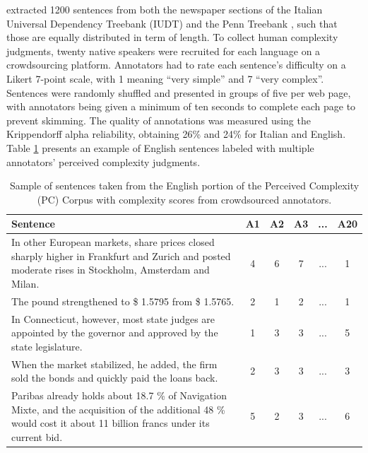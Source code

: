 \documentclass[a4paper, nobind]{templates/ociamthesis}
\begin{document}
\textcite{brunato-etal-2018-sentence} extracted 1200 sentences from both the newspaper sections of the Italian Universal Dependency Treebank (IUDT) \autocite{simi-etal-2014-less} and the Penn Treebank \autocite{mcdonald-etal-2013-universal}, such that those are equally distributed in term of length. To collect human complexity judgments, twenty native speakers were recruited for each language on a crowdsourcing platform. Annotators had to rate each sentence's difficulty on a Likert 7-point scale, with 1 meaning ``very simple'' and 7 ``very complex''. Sentences were randomly shuffled and presented in groups of five per web page, with annotators being given a minimum of ten seconds to complete each page to prevent skimming. The quality of annotations was measured using the Krippendorff alpha reliability, obtaining 26\% and 24\% for Italian and English. Table \ref{tab:pc-example} presents an example of English sentences labeled with multiple annotators' perceived complexity judgments.

\begin{table}

\caption{\label{tab:pc-example}Sample of sentences taken from the English portion of the Perceived Complexity (PC) Corpus with complexity scores from crowdsourced annotators.}
\centering
\begin{tabular}[t]{>{\raggedright\arraybackslash}p{25em}ccccc}
\toprule
\textbf{Sentence} & \textbf{A1} & \textbf{A2} & \textbf{A3} & \textbf{...} & \textbf{A20}\\
\midrule
In other European markets, share prices closed sharply higher in Frankfurt and Zurich and posted moderate rises in Stockholm, Amsterdam and Milan. & 4 & 6 & 7 & ... & 1\\
\addlinespace\hline\addlinespace
The pound strengthened to \$ 1.5795 from \$ 1.5765. & 2 & 1 & 2 & ... & 1\\
\addlinespace\hline\addlinespace
In Connecticut, however, most state judges are appointed by the governor and approved by the state legislature. & 1 & 3 & 3 & ... & 5\\
\addlinespace\hline\addlinespace
When the market stabilized, he added, the firm sold the bonds and quickly paid the loans back. & 2 & 3 & 3 & ... & 3\\
\addlinespace\hline\addlinespace
Paribas already holds about 18.7 \% of Navigation Mixte, and the acquisition of the additional 48 \% would cost it about 11 billion francs under its current bid. & 5 & 2 & 3 & ... & 6\\
\bottomrule
\end{tabular}
\end{table}
\end{document}
